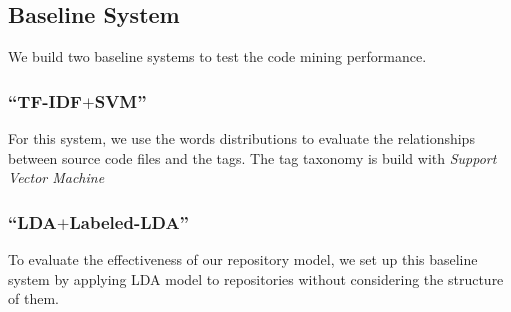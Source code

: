 \subsection{Baseline System}
We build two baseline systems to test the code mining performance.
\subsubsection{``TF-IDF$+$SVM''}
For this system, we use the words distributions to evaluate the relationships
between source code files and the tags. The tag taxonomy is build with
{\it Support Vector Machine}
\subsubsection{``LDA$+$Labeled-LDA''}
To evaluate the effectiveness of our repository model, we set up this baseline
system by applying LDA model to repositories without considering the structure
of them.

